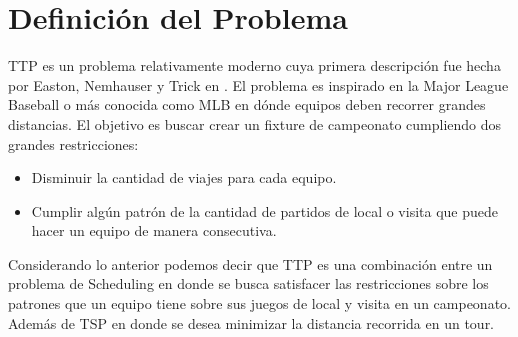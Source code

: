 \documentclass[letter, 10pt]{article}
\begin{document}
\section{Definición del Problema}
    TTP es un problema relativamente moderno cuya primera descripción fue hecha por Easton, Nemhauser y Trick en \cite{Description}. El problema es inspirado en la Major League Baseball o más conocida como MLB en dónde equipos deben recorrer grandes distancias. El objetivo es buscar crear un fixture de campeonato cumpliendo dos grandes restricciones:
\begin{itemize}
    \item Disminuir la cantidad de viajes para cada equipo.
    \item Cumplir algún patrón de la cantidad de partidos de local o visita que puede hacer un equipo de manera consecutiva.
\end{itemize}
    Considerando lo anterior podemos decir que TTP es una combinación entre un problema de Scheduling en donde se busca satisfacer las restricciones sobre los patrones que un equipo tiene sobre sus juegos de local y visita en un campeonato. Además de TSP en donde se desea minimizar la distancia recorrida en un tour.
    
\end{document}
